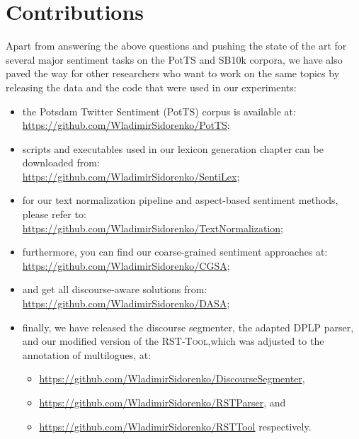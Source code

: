 \section*{Contributions}

Apart from answering the above questions and pushing the state of the
art for several major sentiment tasks on the PotTS and SB10k corpora,
we have also paved the way for other researchers who want to work on
the same topics by releasing the data and the code that were used in
our experiments:
\begin{itemize}
\item the Potsdam Twitter Sentiment (PotTS) corpus is available at:\\
  \url{https://github.com/WladimirSidorenko/PotTS};
\item scripts and executables used in our lexicon generation chapter
  can be downloaded
  from:\\ \url{https://github.com/WladimirSidorenko/SentiLex};
\item for our text normalization pipeline and aspect-based sentiment
  methods, please refer to:\\
  \url{https://github.com/WladimirSidorenko/TextNormalization};
\item furthermore, you can find our coarse-grained sentiment
  approaches at:\\ \url{https://github.com/WladimirSidorenko/CGSA};
\item and get all discourse-aware solutions
  from:\\ \url{https://github.com/WladimirSidorenko/DASA};
\item finally, we have released the discourse segmenter, the adapted
  DPLP parser, and our modified version of the \textsc{RST-Tool},which
  was adjusted to the annotation of multilogues,
  at:
  \begin{itemize}
  \item\url{https://github.com/WladimirSidorenko/DiscourseSegmenter},
  \item\url{https://github.com/WladimirSidorenko/RSTParser}, and
  \item\url{https://github.com/WladimirSidorenko/RSTTool} respectively.
  \end{itemize}
\end{itemize}

